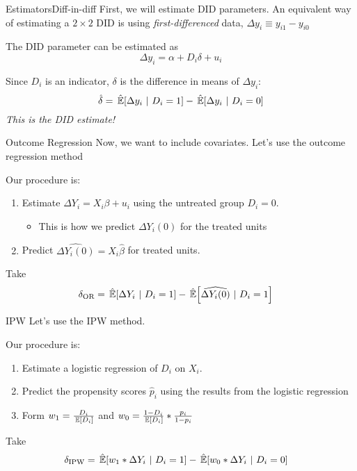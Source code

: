 \documentclass[t]{beamer}
\begin{document}
\begin{frame}{Estimators}{Diff-in-diff}
  First, we will estimate DID parameters.
  An equivalent way of estimating a $2 \times 2$ DID is using \emph{first-differenced} data, $\Delta y_i \equiv y_{i1} - y_{i0}$

  \bigskip
  The DID parameter can be estimated as
  $$
    \Delta y_i = \alpha + D_i \delta + u_i
  $$

  \pause
  \bigskip
  \bigskip
  Since $D_i$ is an indicator, $\delta$ is the difference in means of $\Delta y_i$:
  $$
    \hat{\delta} = \expechat{\Delta y_i}{D_i = 1} - \expechat{\Delta y_i}{D_i = 0}
  $$
  \medskip
  \emph{This is the DID estimate!}
\end{frame}

\begin{frame}{Outcome Regression}
  Now, we want to include covariates.
  Let's use the outcome regression method

  Our procedure is:
  \begin{enumerate}
    \item Estimate $\Delta Y_i = X_i \beta + u_i$ using the untreated group $D_i = 0$.
    \begin{itemize}
      \item This is how we predict $\Delta Y_i(0)$ for the treated units
    \end{itemize}

    \bigskip
    \item Predict $\widehat{\Delta Y_i(0)} = X_i \hat{\beta}$ for treated units.
  \end{enumerate}

  \bigskip
  \bigskip
  Take
  \begin{align*}
    \delta_{\text{OR}} &=
      \expechat{\Delta Y_i}{D_i = 1} - \expechat{\widehat{\Delta Y_i(0)}}{D_i = 1}
  \end{align*}
\end{frame}

\begin{frame}{IPW}
  Let's use the IPW method.

  Our procedure is:
  \begin{enumerate}
    \item Estimate a logistic regression of $D_i$ on $X_i$.

    \bigskip
    \item Predict the propensity scores $\hat{p}_i$ using the results from the logistic regression

    \bigskip
    \item Form $w_1 = \frac{D_i}{\expec{D_i}}$ and $w_0 = \frac{1 - D_i}{\expec{D_i}} * \frac{p_i}{1 - p_i}$
  \end{enumerate}

  \bigskip
  \bigskip
  Take
  \begin{align*}
    \delta_{\text{IPW}} &=
      \expechat{w_1 * \Delta Y_i}{D_i = 1} - \expechat{w_0 * \Delta Y_i}{D_i = 0}
  \end{align*}
\end{frame}
\end{document}
